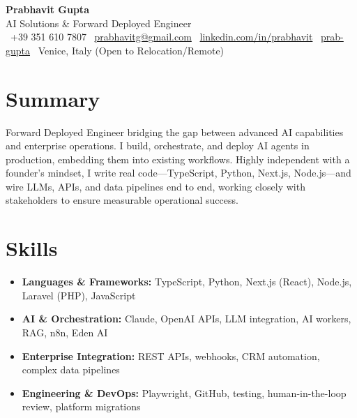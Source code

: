 \documentclass[a4paper,10pt]{article}
\begin{document}
\begin{center}
 {\Huge\bfseries Prabhavit Gupta}\\[3pt]
 {\color{accent}\large AI Solutions \& Forward Deployed Engineer}\\[5pt]
 \faPhone\ +39 351 610 7807 \quad
 \faEnvelope\ \href{mailto:prabhavitg@gmail.com}{prabhavitg@gmail.com} \quad
 \faLinkedin\ \href{https://www.linkedin.com/in/prabhavit/}{linkedin.com/in/prabhavit} \quad
 \faGithub\ \href{https://github.com/prab-gupta}{prab-gupta} \quad
 \faMapMarker*\ Venice, Italy (Open to Relocation/Remote)
\end{center}

\section{Summary}
Forward Deployed Engineer bridging the gap between advanced AI capabilities and enterprise operations. I build, orchestrate, and deploy AI agents in production, embedding them into existing workflows. Highly independent with a founder's mindset, I write real code—TypeScript, Python, Next.js, Node.js—and wire LLMs, APIs, and data pipelines end to end, working closely with stakeholders to ensure measurable operational success.

\section{Skills}
\begin{itemize}
 \item \textbf{Languages \& Frameworks:} TypeScript, Python, Next.js (React), Node.js, Laravel (PHP), JavaScript
 \item \textbf{AI \& Orchestration:} Claude, OpenAI APIs, LLM integration, AI workers, RAG, n8n, Eden AI
 \item \textbf{Enterprise Integration:} REST APIs, webhooks, CRM automation, complex data pipelines
 \item \textbf{Engineering \& DevOps:} Playwright, GitHub, testing, human-in-the-loop review, platform migrations
\end{itemize}

\end{document}
